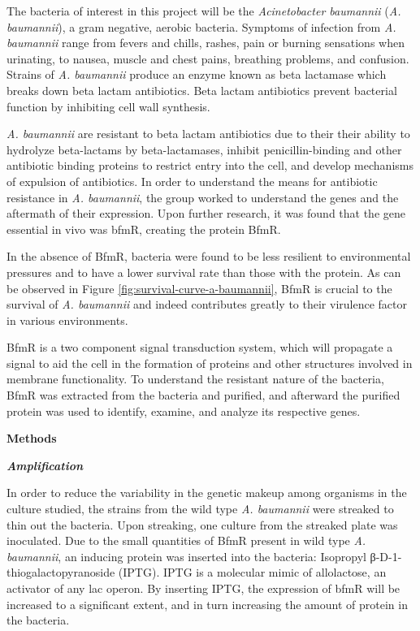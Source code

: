 \documentclass[11pt]{article}
\begin{document}
The bacteria of interest in this project will be the \emph{Acinetobacter baumannii} (\emph{A. baumannii}), a gram negative, aerobic bacteria. Symptoms of infection from \emph{A. baumannii} range from fevers and chills, rashes, pain or burning sensations when urinating, to nausea, muscle and chest pains, breathing problems, and confusion. Strains of \emph{A. baumannii} produce an enzyme known as beta lactamase which breaks down beta lactam antibiotics. Beta lactam antibiotics prevent bacterial function by inhibiting cell wall synthesis.

\emph{A. baumannii} are resistant to beta lactam antibiotics due to their their ability to hydrolyze beta-lactams by beta-lactamases, inhibit penicillin-binding and other antibiotic binding proteins to restrict entry into the cell, and develop mechanisms of expulsion of antibiotics. \cite{bonomo}  In order to understand the means for antibiotic resistance in \emph{A. baumannii}, the group worked to understand the genes and the aftermath of their expression. Upon further research, it was found that the gene essential in vivo was bfmR, creating the protein BfmR.

In the absence of BfmR, bacteria were found to be less resilient to environmental pressures and to have a lower survival rate than those with the protein. As can be observed in Figure \ref{fig:survival-curve-a-baumannii}, BfmR is crucial to the survival of \emph{A. baumannii} and indeed contributes greatly to their virulence factor in various environments.

BfmR is a two component signal transduction system, which will propagate a signal to aid the cell in the formation of proteins and other structures involved in membrane functionality. To understand the resistant nature of the bacteria, BfmR was extracted from the bacteria and purified, and afterward the purified protein was used to identify, examine, and analyze its respective genes.



{\bf Methods}

{\textbf {\emph{Amplification}}}

In order to reduce the variability in the genetic makeup among organisms in the culture studied, the strains from the wild type \emph{A. baumannii} were streaked to thin out the bacteria. Upon streaking, one culture from the streaked plate was inoculated. Due to the small quantities of BfmR present in wild type \emph{A. baumannii}, an inducing protein was inserted into the bacteria: Isopropyl β-D-1-thiogalactopyranoside (IPTG). IPTG is a molecular mimic of allolactose, an activator of any lac operon. By inserting IPTG, the expression of bfmR will be increased to a significant extent, and in turn increasing the amount of protein in the bacteria. 
\end{document}
